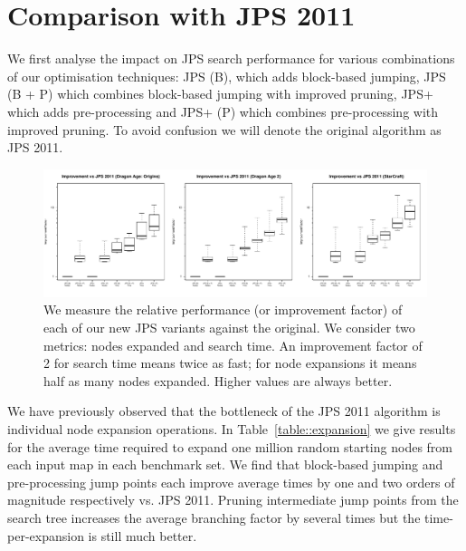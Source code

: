 

\section{Comparison with JPS 2011}
\label{sec::results}


We first analyse the impact on JPS search performance for various combinations of our 
optimisation techniques: JPS (B), which adds block-based 
jumping, JPS (B + P) which combines block-based jumping with improved pruning, JPS+
which adds pre-processing and JPS+ (P) which combines pre-processing with improved pruning.
To avoid confusion we will denote the original algorithm as JPS 2011.

\begin{figure}[tb] 
\begin{center}
		   \includegraphics[width=2.15\columnwidth, trim = 0mm 0mm 0mm 0mm]
			{diagrams/improvement_vs_jps.pdf}
       \end{center}
		\vspace{-1em}
	   \caption{\small We measure the relative performance (or improvement factor) of each of our new JPS variants 
against the original. We consider two metrics: nodes expanded and search time. An improvement factor of 2 
for search time means twice as fast; for node expansions it means half as many nodes expanded. 
Higher values are always better.}
\label{fig::vs_jps2011}
\end{figure}

We have previously observed that the bottleneck of the JPS 2011 algorithm is individual node
expansion operations. In Table~\ref{table::expansion} we give results for the average
time required to expand one million random starting nodes from each input map in
each benchmark set. We find that block-based jumping and pre-processing jump points
each improve average times by one and two orders of magnitude respectively vs. JPS 2011.
Pruning intermediate jump points from the search tree increases the average branching 
factor by several times but the time-per-expansion is still much better. 

